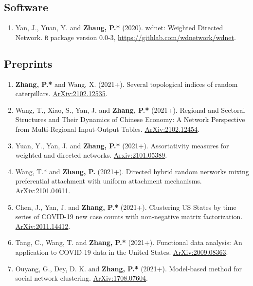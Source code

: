 \documentclass[margin]{res}
\begin{document}
\begin{resume}
\subsection{Software}
\begin{enumerate}
	\item {\sc Yan, J., Yuan, Y.} and {\bf Zhang, P.*} (2020). 
	wdnet: Weighted Directed Network. {\tt R} package version 0.0-3, 
	\url{https://githlab.com/wdnetwork/wdnet}.
\end{enumerate}

\subsection{Preprints}
\begin{enumerate}
	\item {\bf Zhang, P.*} and {\sc Wang, X.} (2021+). Several 
	topological indices of random caterpillars. 
	\href{https://arxiv.org/pdf/2102.12535.pdf}{ArXiv:2102.12535}.
	\item {\sc Wang, T., Xiao, S., Yan, J.} and {\bf Zhang, P.*} 
	(2021+). Regional and Sectoral Structures and Their Dynamics of
	Chinese Economy: A Network Perspective from
	Multi-Regional Input-Output Tables. 
	\href{https://arxiv.org/pdf/2102.12454.pdf}{ArXiv:2102.12454}. 
	\item {\sc Yuan, Y., Yan, J.} and {\bf Zhang, P.*} (2021+). 
	Assortativity measures for weighted and directed
	networks. 
	\href{https://arxiv.org/pdf/2101.05389.pdf}{Arxiv:2101.05389}.
	\item {\sc Wang, T.*} and {\bf Zhang, P.} (2021+). Directed 
	hybrid random 
	networks mixing preferential attachment with uniform attachment 
	mechanisms. 
	\href{https://arxiv.org/pdf/2101.04611.pdf}{ArXiv:2101.04611}.
	\item {\sc Chen, J., Yan, J.} and {\bf Zhang, P.*} (2021+). 
	Clustering US States by time series of COVID-19 new case counts 
	with non-negative matrix factorization. 
	\href{https://arxiv.org/pdf/2011.14412.pdf}{ArXiv:2011.14412}.
	\item {\sc Tang, C., Wang, T.} and {\bf Zhang, P.*} (2021+). 
	Functional data analysis: An application to COVID-19 data in
	the United States. 
	\href{https://arxiv.org/pdf/2009.08363.pdf}{ArXiv:2009.08363}.
	\item {\sc Ouyang, G., Dey, D. K.} and {\bf Zhang, P.*} (2021+). 
	Model-based method for social network clustering. 
	\href{https://arxiv.org/pdf/1708.07604.pdf}{ArXiv:1708.07604}.
\end{enumerate}


\end{resume}
\end{document}
